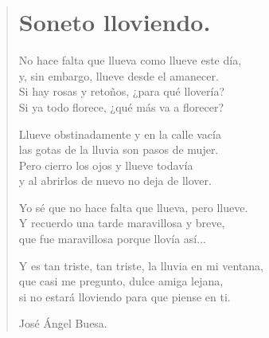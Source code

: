 \documentclass[11pt, portrait, twoside, notitlepage, openright]{book}
\begin{document}
\newpage
\begin{verse}
\begin{center}
\section{Soneto lloviendo.}
\end{center}

No hace falta que llueva como llueve este día,\\
y, sin embargo, llueve desde el amanecer.\\
Si hay rosas y retoños, ¿para qué llovería?\\
Si ya todo florece, ¿qué más va a florecer?
\newline

Llueve obstinadamente y en la calle vacía\\
las gotas de la lluvia son pasos de mujer.\\
Pero cierro los ojos y llueve todavía\\
y al abrirlos de nuevo no deja de llover.
\newline

Yo sé que no hace falta que llueva, pero llueve.\\
Y recuerdo una tarde maravillosa y breve,\\
que fue maravillosa porque llovía así...
\newline

Y es tan triste, tan triste, la lluvia en mi ventana,\\
que casi me pregunto, dulce amiga lejana,\\
si no estará lloviendo para que piense en ti.
\newline

\begin{flushright}
José Ángel Buesa.
\end{flushright}
\end{verse}
\end{document}

